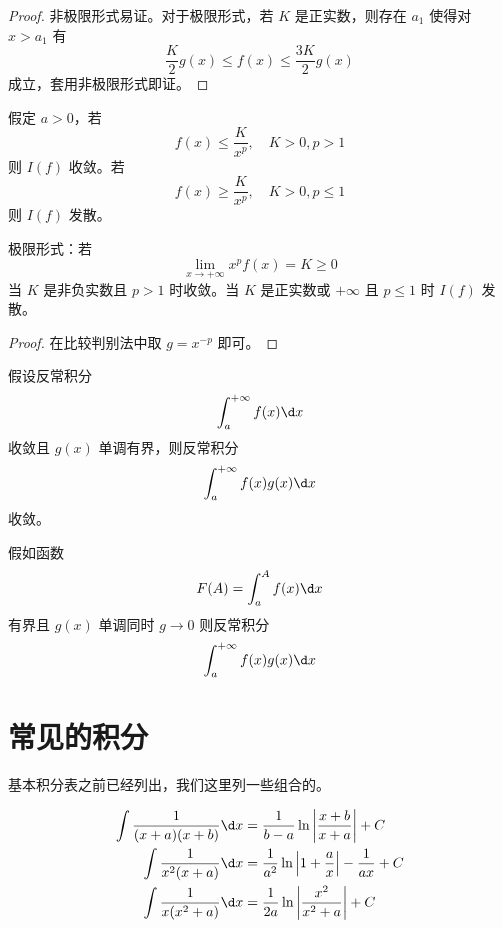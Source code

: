 \begin{proof}
	非极限形式易证。对于极限形式，若 $K$ 是正实数，则存在 $a_1$ 使得对 $x > a_1$ 有
	\[ \frac{K}{2} g(x) \leqslant f(x) \leqslant \frac{3K}{2} g(x) \]
	成立，套用非极限形式即证。
\end{proof}

\begin{theorem}
	假定 $a > 0$，若
	\[ f(x) \leqslant \frac{K}{x^p}, \quad K > 0, p > 1 \]
	则 $I(f)$ 收敛。若
	\[ f(x) \geqslant \frac{K}{x^p}, \quad K > 0, p \leqslant 1 \]
	则 $I(f)$ 发散。

	极限形式：若
	\[ \lim_{x \to +\infty} x^p f(x) = K \geqslant 0 \]
	当 $K$ 是非负实数且 $p > 1$ 时收敛。当 $K$ 是正实数或 $+\infty$ 且 $p \leqslant 1$ 时 $I(f)$ 发散。
\end{theorem}

\begin{proof}
	在比较判别法中取 $g = x^{-p}$ 即可。
\end{proof}

\begin{theorem}
	假设反常积分
	\[ \int_{a}^{+\infty} f(x) \d x \]
	收敛且 $g(x)$ 单调有界，则反常积分
	\[ \int_{a}^{+\infty} f(x) g(x) \d x \]
	收敛。
\end{theorem}

\begin{theorem}
	假如函数
	\[ F(A) = \int_{a}^{A} f(x) \d x \]
	有界且 $g(x)$ 单调同时 $g \to 0$ 则反常积分
	\[ \int_{a}^{+\infty} f(x) g(x) \d x \]
\end{theorem}

\section{常见的积分}

基本积分表之前已经列出，我们这里列一些组合的。



\begin{example}[有理式]
	\[ \begin{aligned}
			\int \frac{1}{(x+a)(x+b)} \d x & = \frac{1}{b-a} \ln \left| \frac{x+b}{x+a} \right| + C                \\
			\int \frac{1}{x^2(x+a)}   \d x & = \frac{1}{a^2} \ln \left| 1 + \frac{a}{x} \right| - \frac{1}{ax} + C \\
			\int \frac{1}{x(x^2+a)}   \d x & = \frac{1}{2a} \ln \left| \frac{x^2}{x^2+a}\right| + C
		\end{aligned} \]
\end{example}

